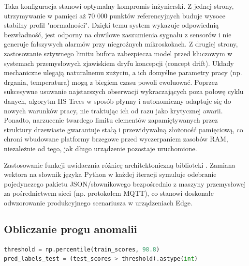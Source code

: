 \documentclass[12pt,twoside]{article}
\begin{document}
Taka konfiguracja stanowi optymalny kompromis inżynierski. Z jednej strony, utrzymywanie w pamięci aż 70 000 punktów referencyjnych buduje wysoce stabilny profil "normalności". Dzięki temu system wykazuje odpowiednią bezwładność, jest odporny na chwilowe zaszumienia sygnału z sensorów i nie generuje fałszywych alarmów przy niegroźnych mikroskokach. Z drugiej strony, zastosowanie sztywnego limitu bufora zabezpiecza model przed kluczowym w systemach przemysłowych zjawiskiem dryfu koncepcji (concept drift). Układy mechaniczne ulegają naturalnemu zużyciu, a ich domyślne parametry pracy (np. drgania, temperatura) mogą z biegiem czasu powoli ewoluować. Poprzez sukcesywne usuwanie najstarszych obserwacji wykraczających poza połowę cyklu danych, algorytm HS-Trees w sposób płynny i autonomiczny adaptuje się do nowych warunków pracy, nie traktując ich od razu jako krytycznej awarii. Ponadto, narzucenie twardego limitu elementów zapamiętywanych przez struktury drzewiaste gwarantuje stałą i przewidywalną złożoność pamięciową, co chroni wbudowane platformy brzegowe przed wyczerpaniem zasobów RAM, niezależnie od tego, jak długo urządzenie pozostaje uruchomione.

Zastosowanie funkcji  uwidacznia różnicę architektoniczną biblioteki . Zamiana wektora  na słownik języka Python w każdej iteracji symuluje odebranie pojedynczego pakietu JSON/słownikowego bezpośrednio z maszyny przemysłowej za pośrednictwem sieci (np. protokołem MQTT), co stanowi doskonałe odwzorowanie produkcyjnego scenariusza w urządzeniach Edge.

\subsection{Obliczanie progu anomalii}
\begin{lstlisting}[language=python, numbers=none, caption={Próg anomalii}, label={lst:th}]
threshold = np.percentile(train_scores, 98.8)
pred_labels_test = (test_scores > threshold).astype(int)
\end{lstlisting}
\end{document}
